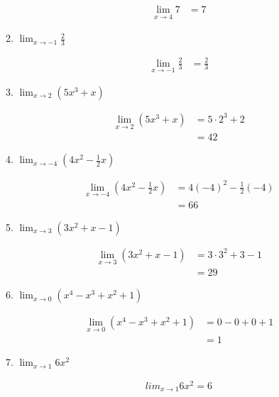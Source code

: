\documentclass[a4paper, 12pt]{article}
\begin{document}
\begin{enumerate}
\begin{enumerate}
        \begin{align*}
            \lim_{x \to 4} 7 &= 7 \tag*{[l. const.]}
        \end{align*}

        \item $\lim_{x \to -1} \frac{2}{3}$
        
        \begin{align*}
            \lim_{x \to -1} \frac{2}{3} &= \frac{2}{3} \tag*{[l. const.]}
        \end{align*}

        \item $\lim_{x \to 2}(5x^3 + x)$
        
        \begin{align*}
            \lim_{x \to 2}(5x^3 + x) &= 5\cdot 2^3 + 2 \tag*{[l. pol.]} \\
            &= 42
        \end{align*}

        \item $\lim_{x \to -4} \left( 4x^2 - \frac{1}{2}x \right)$
        
        \begin{align*}
            \lim_{x \to -4} \left( 4x^2 - \frac{1}{2}x \right) &= 4(-4)^2 - \frac{1}{2}(-4) \tag*{[l. pol.]}\\
            &= 66
        \end{align*}

        \item $\lim_{x \to 3} (3x^2 + x - 1)$
        
        \begin{align*}
            \lim_{x \to 3} (3x^2 + x - 1) &= 3\cdot 3^2 + 3 - 1 \tag*{[l. pol.]}\\
            &= 29
        \end{align*}

        \item $\lim_{x \to 0} (x^4 -x^3 + x^2 +1)$
        
        \begin{align*}
            \lim_{x \to 0} (x^4 -x^3 + x^2 +1) &= 0 - 0 +0 + 1 \tag*{[l. pol.]}\\
            &= 1
        \end{align*}

        \item $\lim_{x \to 1} 6x^2$
        
        \begin{align*}
            lim_{x \to 1} 6x^2 = 6 \tag*{[l. pol.]}
        \end{align*}


\end{enumerate}
\end{enumerate}
\end{document}
